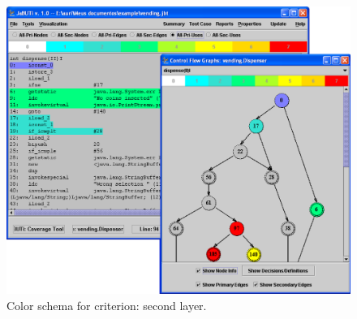 \begin{figure}[!ht]
\begin{center}
\includegraphics[height=0.40\textheight]{fig/pri-uses-layer2}
\caption{\label{fig:uses-color2} Color schema for
 criterion: second layer.}
\end{center}
\end{figure}
